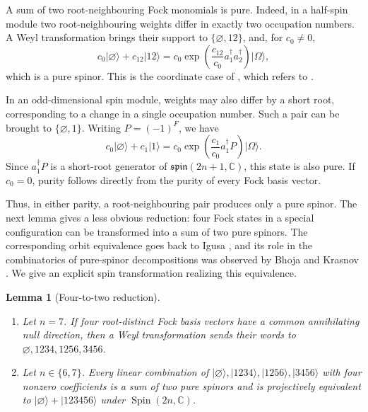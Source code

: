 \documentclass{article}
\newtheorem{lemma}[theorem]{Lemma}
\theoremstyle{definition}
\theoremstyle{remark}
\newcommand{\vac}{|\Omega\rangle}
\newcommand{\C}{\mathbb C}
\newcommand{\Spin}{\operatorname{Spin}}
\newcommand{\ket}[1]{\lvert #1\rangle}
\begin{document}
A sum of two root-neighbouring Fock monomials is pure. Indeed, in a half-spin module two root-neighbouring weights differ in exactly
two occupation numbers. A Weyl transformation brings their support to $\{\varnothing,12\}$, and, for $c_0\ne0$,
\begin{equation}
 c_0\ket\varnothing+c_{12}\ket{12}
 =c_0\exp\left(
 \frac{c_{12}}{c_0}a_1^\dagger a_2^\dagger
 \right)\vac,
\end{equation}
which is a pure spinor. This is the coordinate case of \cite[Proposition~5]{Trautman_Budinich}, which refers to \cite[Proposition~III.1.12]{Chevalley1954}.

In an odd-dimensional spin module, weights may also differ by a short root, corresponding to a change in a single occupation number. Such a pair can be brought to $\{\varnothing,1\}$. Writing $P=(-1)^F$, we have
\begin{equation}
 c_0\ket\varnothing+c_1\ket1
 =c_0\exp\left(
 \frac{c_1}{c_0}a_1^\dagger P
 \right)\vac.
\end{equation}
Since $a_1^\dagger P$ is a short-root
generator of $\mathfrak{spin}(2n+1,\C)$, this state is also pure. If $c_0=0$, purity follows directly from the purity of every Fock basis vector.

Thus, in either parity, a root-neighbouring
pair produces only a pure spinor.
The next lemma gives a less obvious reduction:
four Fock states in a special configuration
can be transformed into a sum of two pure
spinors. The corresponding orbit equivalence
goes back to Igusa
\cite{Igusa1970uptodim12}, and its role
in the combinatorics of pure-spinor
decompositions was observed by
Bhoja and Krasnov \cite{BhojaKrasnov2025}.
We give an explicit spin transformation
realizing this equivalence.


\begin{lemma}[Four-to-two reduction]
\label{lem:s14-four-to-two}
\begin{enumerate}
\item Let $n=7$. If four root-distinct Fock basis vectors have a common
      annihilating null direction, then a Weyl transformation sends their
      words to $\varnothing,1234,1256,3456$.
\item Let $n\in\{6,7\}$. Every linear combination of
      $\ket\varnothing,\ket{1234},\ket{1256},\ket{3456}$ with four nonzero
      coefficients is a sum of two pure spinors and is projectively
      equivalent to $\ket\varnothing+\ket{123456}$ under
      $\Spin(2n,\C)$.
\end{enumerate}
\end{lemma}
\end{document}
